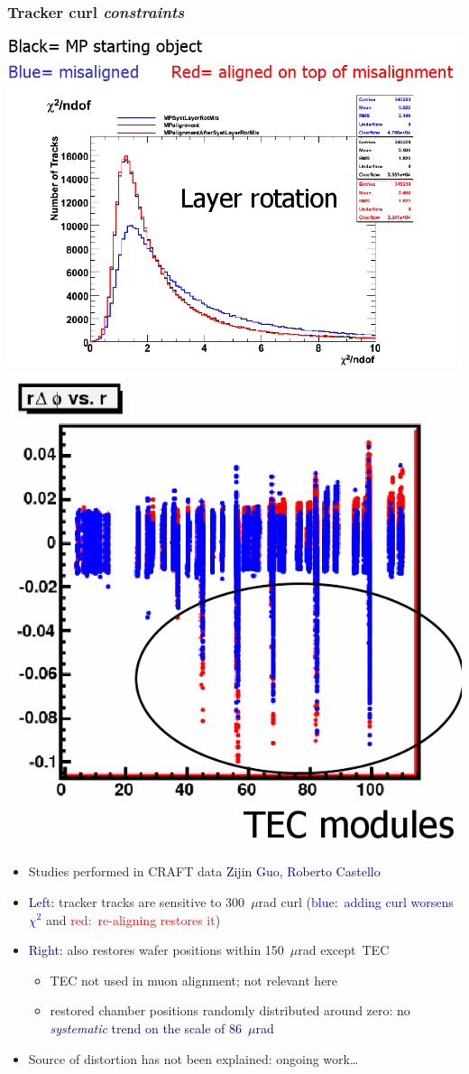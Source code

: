 \documentclass[compress]{beamer}
\begin{document}
\begin{frame}
\frametitle{Tracker curl {\it constraints}}

\includegraphics[width=0.55\linewidth]{tracks_are_sensitive_to_curl.png} \hfill \includegraphics[width=0.35\linewidth]{curl_is_not_86microns.png}

\begin{itemize}
\item Studies performed in CRAFT data \hfill \textcolor{darkblue}{\scriptsize Zijin Guo, Roberto Castello}
\item \textcolor{darkblue}{Left:} tracker tracks are sensitive to 300~$\mu$rad curl (\textcolor{blue}{blue:\ adding curl worsens $\chi^2$} and \textcolor{red}{red:\ re-aligning restores it})
\item \textcolor{darkblue}{Right:} also restores wafer positions within 150~$\mu$rad \mbox{except TEC\hspace{-1 cm}}
\begin{itemize}
\item TEC not used in muon alignment; not relevant here
\item restored chamber positions randomly distributed around zero: \textcolor{darkblue}{no {\it systematic} trend on the scale of 86~$\mu$rad}
\end{itemize}
\item Source of distortion has not been explained: ongoing work\ldots
\end{itemize}
\end{frame}
\end{document}
